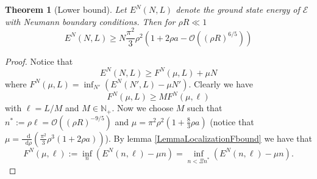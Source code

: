 \documentclass[a4paper,11pt]{article}
\newcommand*\diff{\mathop{}\!\mathrm{d}}
\newtheorem{theorem}{Theorem}
\numberwithin{equation}{section}
\begin{document}
	
		\begin{theorem}[Lower bound] Let $ E^N(N,L) $ denote the ground state energy of $ \mathcal{E} $ with Neumann boundary conditions. Then for $ \rho R \ll 1 $
			\begin{equation}
			E^N(N,L)\geq N\frac{\pi^2}{3}\rho^2\left(1+2\rho a-\mathcal{O}\left((\rho R)^{6/5}\right)\right)
			\end{equation}
		\end{theorem}
		\begin{proof}
			Notice that \begin{equation}
			E^N(N,L)\geq F^N(\mu,L)+\mu N
			\end{equation}
			where $ F^N(\mu,L)=\inf_{N'}\left(E^N(N',L)-\mu N'\right) $. Clearly we have \begin{equation}
			F^N(\mu,L)\geq M F^N(\mu,\ell)\label{EqLocalizationF}
			\end{equation}
			with $ \ell=L/M $ and $ M\in \mathbb{N}_+ $. 
			Now we choose $ M $ such that $ n^*:=\rho\ell=\mathcal{O}\left(\left(\rho R\right)^{-9/5}\right) $ and $ \mu=\pi^2\rho^2\left(1+\frac{8}{3}\rho a\right) $ (notice that $ \mu=\frac{\diff}{\diff \rho}(\frac{\pi^2}{3}\rho^3(1+2\rho a))$). By lemma \ref{LemmaLocalizationFbound} we have that \begin{equation}
			F^N(\mu,\ell):=\inf_{n}\left(E^N(n,\ell)-\mu n\right)=\inf_{n<\Xi n^*}\left(E^N(n,\ell)-\mu n\right).
			\end{equation}

\end{proof}
\end{document}
